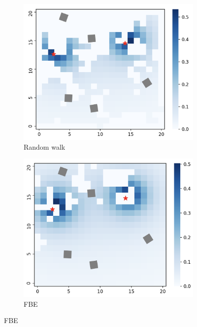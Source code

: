 \documentclass[letterpaper, 10 pt, conference]{ieeeconf}
\begin{document}
\begin{figure}
    \centering
    \begin{subfigure}{0.32\textwidth}
        \includegraphics[width=\textwidth]{images/heatmap_random.png}
        \caption{Random walk}
        \label{results:beliefrandom}
    \end{subfigure}
    \begin{subfigure}{0.32\textwidth}
        \includegraphics[width=\textwidth]{images/heatmap_frontier.png}
        \caption{FBE}
        \label{results:belieffrontier}
    \end{subfigure}

\end{figure}
\end{document}
